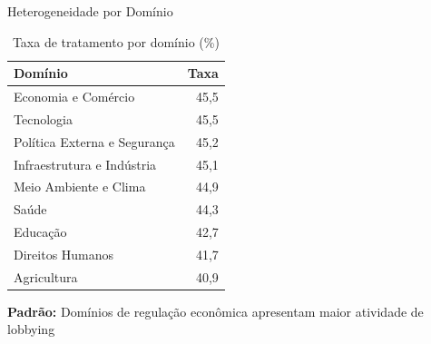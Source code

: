 \documentclass[aspectratio=169]{beamer}
\begin{document}
\begin{frame}{Heterogeneidade por Domínio}
\begin{table}
\centering
\caption{Taxa de tratamento por domínio (\%)}
\begin{tabular}{lr}
\toprule
\textbf{Domínio} & \textbf{Taxa} \\
\midrule
Economia e Comércio & 45,5 \\
Tecnologia & 45,5 \\
Política Externa e Segurança & 45,2 \\
Infraestrutura e Indústria & 45,1 \\
Meio Ambiente e Clima & 44,9 \\
Saúde & 44,3 \\
Educação & 42,7 \\
Direitos Humanos & 41,7 \\
Agricultura & 40,9 \\
\bottomrule
\end{tabular}
\end{table}

\textbf{Padrão:} Domínios de regulação econômica apresentam maior atividade de lobbying
\end{frame}
\end{document}
